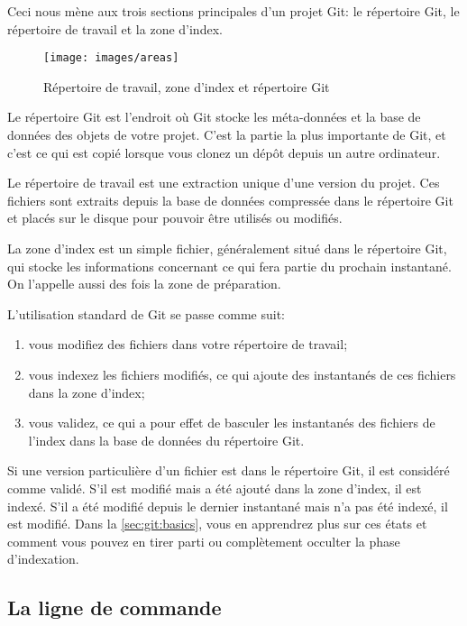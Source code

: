 Ceci nous mène aux trois sections principales d'un projet Git: le répertoire Git, le répertoire de travail et la zone d'index.

\begin{figure}[H]
  \centering
  \texttt{[image: images/areas]}
  \caption{Répertoire de travail, zone d'index et répertoire Git}
  \label{fig:git:areas}
\end{figure}

Le répertoire Git est l'endroit où Git stocke les méta-données et la base de données des objets de votre projet.
C'est la partie la plus importante de Git, et c'est ce qui est copié lorsque vous clonez un dépôt depuis un autre ordinateur.

Le répertoire de travail est une extraction unique d'une version du projet.
Ces fichiers sont extraits depuis la base de données compressée dans le répertoire Git et placés sur le disque pour pouvoir être utilisés ou modifiés.

La zone d'index est un simple fichier, généralement situé dans le répertoire Git, qui stocke les informations concernant ce qui fera partie du prochain instantané. On l'appelle aussi des fois la zone de préparation.

L'utilisation standard de Git se passe comme suit:
\begin{enumerate}
\item vous modifiez des fichiers dans votre répertoire de travail;
\item vous indexez les fichiers modifiés, ce qui ajoute des instantanés de ces fichiers dans la zone d'index;
\item vous validez, ce qui a pour effet de basculer les instantanés des fichiers de l'index dans la base de données du répertoire Git.
\end{enumerate}

Si une version particulière d'un fichier est dans le répertoire Git, il est considéré comme validé.
S'il est modifié mais a été ajouté dans la zone d'index, il est indexé.
S'il a été modifié depuis le dernier instantané mais n'a pas été indexé, il est modifié.
Dans la \autoref{sec:git:basics}, vous en apprendrez plus sur ces états et comment vous pouvez en tirer parti ou complètement occulter la phase d'indexation.

\subsection{La ligne de commande}

